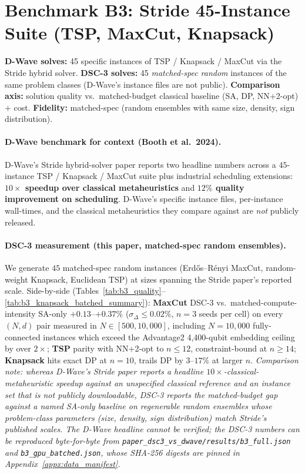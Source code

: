 \documentclass[11pt,a4paper]{article}
\begin{document}
\section{Benchmark B3: Stride 45-Instance Suite (TSP, MaxCut, Knapsack)}
\label{sec:b3}

\textbf{D-Wave solves:} 45 specific instances of TSP / Knapsack /
MaxCut via the Stride hybrid solver.
\textbf{DSC-3 solves:} 45 \emph{matched-spec random} instances of the
same problem classes (D-Wave's instance files are not public).
\textbf{Comparison axis:} solution quality vs.\ matched-budget
classical baseline (SA, DP, NN+2-opt) $+$ cost.
\textbf{Fidelity:} matched-spec (random ensembles with same size,
density, sign distribution).

\paragraph{D-Wave benchmark for context (Booth et al.~2024).}
D-Wave's Stride hybrid-solver paper reports two headline numbers across
a $45$-instance TSP / Knapsack / MaxCut suite plus industrial scheduling
extensions: \textbf{$10\!\times$ speedup over classical metaheuristics}
and \textbf{$12\%$ quality improvement on scheduling}. D-Wave's
specific instance files, per-instance wall-times, and the classical
metaheuristics they compare against are \emph{not} publicly released.

\paragraph{DSC-3 measurement (this paper, matched-spec random
ensembles).}
We generate $45$ matched-spec random instances (Erdős--Rényi MaxCut,
random-weight Knapsack, Euclidean TSP) at sizes spanning the Stride
paper's reported scale. Side-by-side
(Tables~\ref{tab:b3_quality}--\ref{tab:b3_knapsack_batched_summary}):
\textbf{MaxCut} DSC-3 vs.\ matched-compute-intensity SA-only
$+0.13$--$+0.37\%$ ($\sigma_\Delta\!\le\!0.02\%$, $n\!=\!3$ seeds per
cell) on every $(N, d)$ pair measured in $N\!\in\![500, 10{,}000]$,
including $N\!=\!10{,}000$ fully-connected instances which exceed the
Advantage2 4{,}400-qubit embedding ceiling by over $2\times$;
\textbf{TSP} parity with NN+2-opt to $n\!\le\!12$, constraint-bound at
$n\!\ge\!14$; \textbf{Knapsack} hits exact DP at $n\!=\!10$, trails DP
by $3$--$17\%$ at larger $n$. \emph{Comparison note: whereas D-Wave's Stride paper
reports a headline $10\times$-classical-metaheuristic speedup against
an unspecified classical reference and an instance set that is not
publicly downloadable, DSC-3 reports the matched-budget gap against
a named SA-only baseline on regenerable random ensembles whose
problem-class parameters (size, density, sign distribution) match
Stride's published scales. The D-Wave headline cannot be verified;
the DSC-3 numbers can be reproduced byte-for-byte from
\texttt{paper\_dsc3\_vs\_dwave/results/b3\_full.json} and
\texttt{b3\_gpu\_batched.json}, whose SHA-256 digests are pinned in
Appendix~\ref{appx:data_manifest}.}
\end{document}
